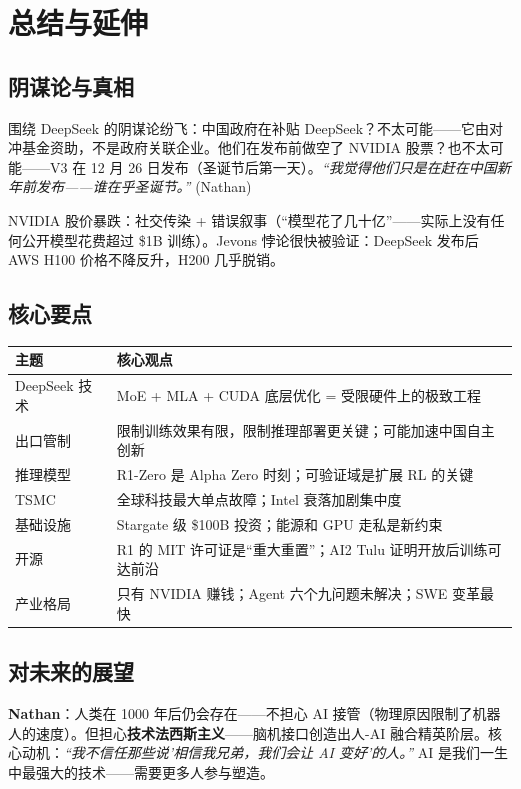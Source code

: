 \section{总结与延伸}

\subsection{阴谋论与真相}

围绕 DeepSeek 的阴谋论纷飞：中国政府在补贴 DeepSeek？不太可能——它由对冲基金资助，不是政府关联企业。他们在发布前做空了 NVIDIA 股票？也不太可能——V3 在 12 月 26 日发布（圣诞节后第一天）。\textit{``我觉得他们只是在赶在中国新年前发布——谁在乎圣诞节。''} (Nathan)

NVIDIA 股价暴跌：社交传染 + 错误叙事（``模型花了几十亿''——实际上没有任何公开模型花费超过 \$1B 训练）。Jevons 悖论很快被验证：DeepSeek 发布后 AWS H100 价格不降反升，H200 几乎脱销。

\subsection{核心要点}

\begin{table}[H]
\centering
\begin{tabular}{lp{9cm}}
\toprule
\textbf{主题} & \textbf{核心观点} \\
\midrule
DeepSeek 技术 & MoE + MLA + CUDA 底层优化 = 受限硬件上的极致工程 \\
出口管制 & 限制训练效果有限，限制推理部署更关键；可能加速中国自主创新 \\
推理模型 & R1-Zero 是 Alpha Zero 时刻；可验证域是扩展 RL 的关键 \\
TSMC & 全球科技最大单点故障；Intel 衰落加剧集中度 \\
基础设施 & Stargate 级 \$100B 投资；能源和 GPU 走私是新约束 \\
开源 & R1 的 MIT 许可证是``重大重置''；AI2 Tulu 证明开放后训练可达前沿 \\
产业格局 & 只有 NVIDIA 赚钱；Agent 六个九问题未解决；SWE 变革最快 \\
\bottomrule
\end{tabular}
\end{table}

\subsection{对未来的展望}

\textbf{Nathan}：人类在 1000 年后仍会存在——不担心 AI 接管（物理原因限制了机器人的速度）。但担心\textbf{技术法西斯主义}——脑机接口创造出人-AI 融合精英阶层。核心动机：\textit{``我不信任那些说'相信我兄弟，我们会让 AI 变好'的人。''} AI 是我们一生中最强大的技术——需要更多人参与塑造。

